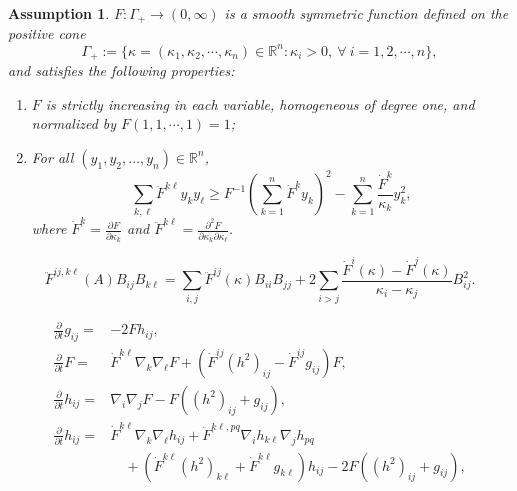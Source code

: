 \documentclass[10pt,a4paper]{amsart}
\newtheorem{assumption}{Assumption}
\begin{document}
\begin{assumption}	\label{assumption}
$F:\Gamma_+\to (0,\infty)$ is a smooth symmetric function defined on the positive cone
	\begin{equation*}
		\Gamma_+ := \{ \kappa=(\kappa_1,\kappa_2,\cdots,\kappa_n)\in\mathbb{R}^n:\kappa_i>0,\ \forall\ i=1,2,\cdots,n \},
	\end{equation*}
	and satisfies the following properties:
	\begin{enumerate}
		\item[{\rm (i)}] $F$ is strictly increasing in each variable, homogeneous of degree one, and normalized by $F(1,1,\cdots,1)=1$;
		\item[{\rm (ii)}] For all $(y_1,y_2,\dots,y_n)\in\mathbb{R}^n$,
		\begin{equation}
			\sum\limits_{k,\ell}\ddot{F}^{k\ell}y_ky_{\ell} \geq F^{-1} \left(\sum\limits_{k=1}^n \dot{F}^k y_k \right)^2 - \sum\limits_{k=1}^n \dfrac{\dot{F}^k}{\kappa_k}y_k^2,
			\label{equ-property3}
		\end{equation}
        where $\dot{F}^k=\frac{\partial F}{\partial \kappa_k}$ and $\ddot{F}^{k\ell}=\frac{\partial^2F}{\partial\kappa_k\partial\kappa_\ell}$. 
	\end{enumerate}
\end{assumption}

\begin{equation}
	\ddot{F}^{ij,k\ell}(A)B_{ij}B_{k\ell} = \sum\limits_{i,j}\ddot{F}^{ij}(\kappa)B_{ii}B_{jj} + 2 \sum\limits_{i>j} \dfrac{\dot{F}^i(\kappa)-\dot{F}^j(\kappa)}{\kappa_i-\kappa_j}B_{ij}^2.
	\label{equ-secf}
\end{equation}

\begin{align}
    \frac{\partial}{\partial t}g_{ij}=&-2Fh_{ij},\label{s2.evl-g}\\
		\frac{\partial}{\partial t} F = & \dot{F}^{k\ell}\nabla_k\nabla_{\ell}F + \left( \dot{F}^{ij}(h^2)_{ij}- \dot{F}^{ij}g_{ij} \right)F,  \label{equ-psi}\\
        \frac{\partial}{\partial t}h_{ij}=&\nabla_i\nabla_jF-F\left((h^2)_{ij}+g_{ij}\right),\label{s2.evl-h1}\\
        \frac{\partial}{\partial t}h_{ij}=&\dot{F}^{k\ell}\nabla_k\nabla_{\ell}h_{ij} + \ddot{F}^{k\ell,pq}\nabla_i h_{k\ell} \nabla_j h_{pq} \nonumber\\
        &\quad + \left( \dot{F}^{k\ell}(h^2)_{k\ell} + \dot{F}^{k\ell}g_{k\ell}\right)h_{ij} - 2F\left((h^2)_{ij}+ g_{ij}\right),  \label{s2.evlh2}
		\end{align}
\end{document}
